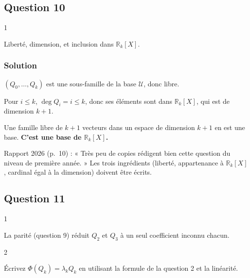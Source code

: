 \documentclass[11pt,a4paper]{article}
\begin{document}
\hypertarget{question-10}{%
\subsection{Question 10}\label{question-10}}

\begin{indication}{1}

Liberté, dimension, et inclusion dans \(\mathbb R_k[X]\).

\end{indication}

\hypertarget{solution-30}{%
\subsubsection{Solution}\label{solution-30}}

\((Q_0,\dots,Q_k)\) est une sous-famille de la base \(\mathcal U\), donc libre.

Pour \(i\le k\), \(\deg Q_i=i\le k\), donc ses éléments sont dans \(\mathbb R_k[X]\), qui est de dimension \(k+1\).

Une famille libre de \(k+1\) vecteurs dans un espace de dimension \(k+1\) en est une base. \textbf{C'est une base de \(\mathbb R_k[X]\).}

\begin{jury}

Rapport 2026 (p.~10) : « Très peu de copies rédigent bien cette question du niveau de première année. » Les trois ingrédients (liberté, appartenance à \(\mathbb R_k[X]\), cardinal égal à la dimension) doivent être écrits.

\end{jury}

\hypertarget{question-11}{%
\subsection{Question 11}\label{question-11}}

\begin{indication}{1}

La parité (question 9) réduit \(Q_2\) et \(Q_3\) à un seul coefficient inconnu chacun.

\end{indication}

\begin{indication}{2}

Écrivez \(\Phi(Q_k)=\lambda_kQ_k\) en utilisant la formule de la question 2 et la linéarité.

\end{indication}
\end{document}

